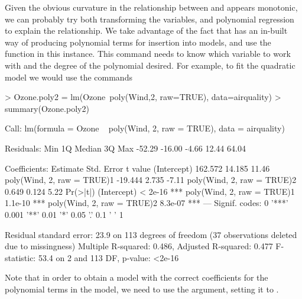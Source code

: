 Given the obvious curvature in the relationship between  and  appears monotonic, we can probably try both transforming the variables, and polynomial regression to explain the relationship. We take advantage of the  
fact that \R{} has an in-built way of producing polynomial terms for insertion into models, and use the  function in this instance. This command needs to know which variable to work with and the degree of the polynomial desired. For example, to fit the quadratic model we would use the commands 
\begin{Schunk}
\begin{Sinput}
> Ozone.poly2 = lm(Ozone~poly(Wind,2, raw=TRUE), data=airquality) 
> summary(Ozone.poly2) 
\end{Sinput}
\begin{Soutput}

Call:
lm(formula = Ozone ~ poly(Wind, 2, raw = TRUE), data = airquality)

Residuals:
   Min     1Q Median     3Q    Max 
-52.29 -16.00  -4.66  12.44  64.04 

Coefficients:
                           Estimate Std. Error t value
(Intercept)                 162.572     14.185   11.46
poly(Wind, 2, raw = TRUE)1  -19.444      2.735   -7.11
poly(Wind, 2, raw = TRUE)2    0.649      0.124    5.22
                           Pr(>|t|)    
(Intercept)                 < 2e-16 ***
poly(Wind, 2, raw = TRUE)1  1.1e-10 ***
poly(Wind, 2, raw = TRUE)2  8.3e-07 ***
---
Signif. codes:  
0 '***' 0.001 '**' 0.01 '*' 0.05 '.' 0.1 ' ' 1

Residual standard error: 23.9 on 113 degrees of freedom
  (37 observations deleted due to missingness)
Multiple R-squared:  0.486,	Adjusted R-squared:  0.477 
F-statistic: 53.4 on 2 and 113 DF,  p-value: <2e-16
\end{Soutput}
\end{Schunk}
Note that in order to obtain a model with the correct coefficients for the polynomial terms in the model, we need to use the  argument, setting it to .  
 
